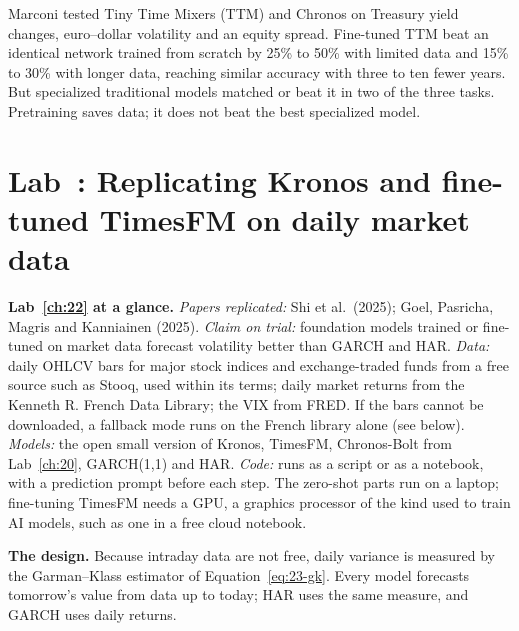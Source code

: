 Marconi tested Tiny Time Mixers (TTM) and Chronos on Treasury yield changes, euro--dollar volatility and an equity spread. Fine-tuned TTM beat an identical network trained from scratch by 25\% to 50\% with limited data and 15\% to 30\% with longer data, reaching similar accuracy with three to ten fewer years. But specialized traditional models matched or beat it in two of the three tasks. Pretraining saves data; it does not beat the best specialized model.

\section{Lab~\thechapter: Replicating Kronos and fine-tuned TimesFM on daily market data}
\label{sec:23-lab}

\begin{callout}
\textbf{Lab~\ref{ch:22} at a glance.} \emph{Papers replicated:} Shi et al.\ (2025); Goel, Pasricha, Magris and Kanniainen (2025). \emph{Claim on trial:} foundation models trained or fine-tuned on market data forecast volatility better than GARCH and HAR. \emph{Data:} daily OHLCV bars for major stock indices and exchange-traded funds from a free source such as Stooq, used within its terms; daily market returns from the Kenneth R. French Data Library; the VIX from FRED. If the bars cannot be downloaded, a fallback mode runs on the French library alone (see below). \emph{Models:} the open small version of Kronos, TimesFM, Chronos-Bolt from Lab~\ref{ch:20}, GARCH(1,1) and HAR. \emph{Code:} runs as a script or as a notebook, with a prediction prompt before each step. The zero-shot parts run on a laptop; fine-tuning TimesFM needs a GPU, a graphics processor of the kind used to train AI models, such as one in a free cloud notebook.
\end{callout}

\textbf{The design.} Because intraday data are not free, daily variance is measured by the Garman--Klass estimator of Equation~\eqref{eq:23-gk}. Every model forecasts tomorrow's value from data up to today; HAR uses the same measure, and GARCH uses daily returns.

